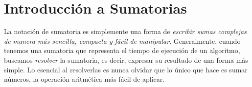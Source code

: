 \section{Introducción a Sumatorias}
La notación de sumatoria es simplemente una forma de \textit{escribir sumas complejas de manera más sencilla, compacta y fácil de manipular}. Generalmente, cuando tenemos una sumatoria que representa el tiempo de ejecución de un algoritmo, buscamos \textit{resolver} la sumatoria, es decir, expresar su resultado de una forma más simple. Lo esencial al resolverlas es nunca olvidar que lo único que hace es sumar números, la operación aritmética más fácil de aplicar.